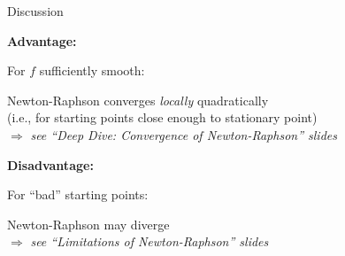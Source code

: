 \documentclass[11pt,compress,t,notes=noshow, xcolor=table]{beamer}
\begin{document}
\begin{framei}[sep=L]{Discussion}
\item \textbf{Advantage:}
\item[] For $f$ sufficiently smooth:
\begin{framed}
\centering
Newton-Raphson converges \textit{locally} quadratically \\
(i.e., for starting points close enough to stationary point) \\
$\Rightarrow$ \emph{see ``Deep Dive: Convergence of Newton-Raphson'' slides}
\end{framed}
\vfill
\item \textbf{Disadvantage:}
\item[] For \enquote{bad} starting points:
\begin{framed}
\centering
Newton-Raphson may diverge \\
$\Rightarrow$ \emph{see ``Limitations of Newton-Raphson'' slides}
\end{framed}
\end{framei}

\endlecture
\end{document}
